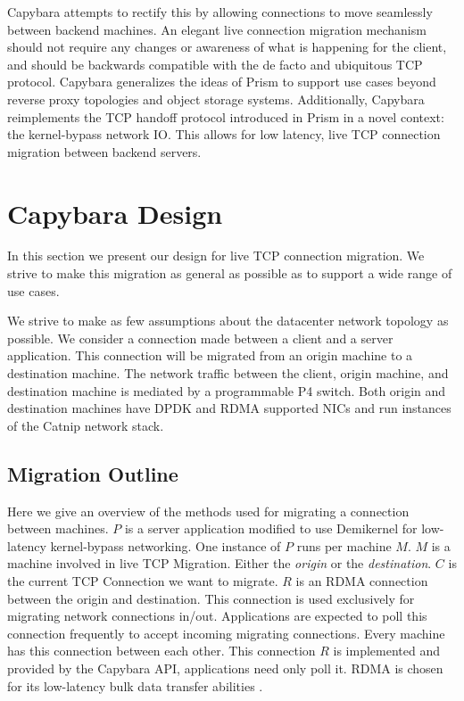 Capybara attempts to rectify this by allowing connections to move seamlessly between backend machines. An elegant live connection migration mechanism should not require any changes or awareness of what is happening for the client, and should be backwards compatible with the de facto and ubiquitous TCP protocol. Capybara generalizes the ideas of Prism to support use cases beyond reverse proxy topologies and object storage systems. Additionally, Capybara reimplements the TCP handoff protocol introduced in Prism in a novel context: the kernel-bypass network IO. This allows for low latency, live TCP connection migration between backend servers.

\section{Capybara Design}
In this section we present our design for live TCP connection migration. We strive to make this migration as general as possible as to support a wide range of use cases.

We strive to make as few assumptions about the datacenter network topology as possible. We consider a connection made between a client and a server application. This connection will be migrated from an origin machine to a destination machine. The network traffic between the client, origin machine, and destination machine is mediated by a programmable P4 switch. Both origin and destination machines have DPDK and RDMA supported NICs and run instances of the Catnip network stack.

\subsection{Migration Outline}
Here we give an overview of the methods used for migrating a connection between machines. $P$ is a server application modified to use Demikernel for low-latency kernel-bypass networking. One instance of $P$ runs per machine $M$. $M$ is a machine involved in live TCP Migration. Either the \textit{origin} or the \textit{destination}. $C$ is the current TCP Connection we want to migrate.
$R$ is an RDMA connection between the origin and destination. This connection is used exclusively for migrating network connections in/out. Applications are expected to poll this connection frequently to accept incoming migrating connections. Every machine has this connection between each other. This connection $R$ is implemented and provided by the Capybara API, applications need only poll it. RDMA is chosen for its low-latency bulk data transfer abilities \cite{farm}.


